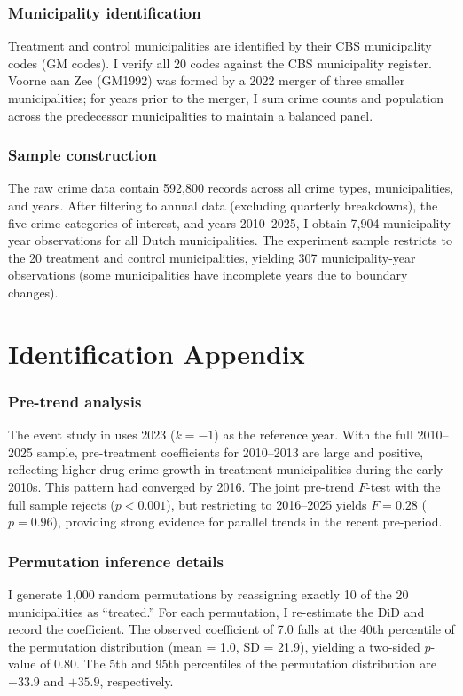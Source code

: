 \documentclass[12pt]{article}
\begin{document}
\subsubsection*{Municipality identification} Treatment and control municipalities are identified by their CBS municipality codes (GM codes). I verify all 20 codes against the CBS municipality register. Voorne aan Zee (GM1992) was formed by a 2022 merger of three smaller municipalities; for years prior to the merger, I sum crime counts and population across the predecessor municipalities to maintain a balanced panel.

\subsubsection*{Sample construction} The raw crime data contain 592,800 records across all crime types, municipalities, and years. After filtering to annual data (excluding quarterly breakdowns), the five crime categories of interest, and years 2010--2025, I obtain 7,904 municipality-year observations for all Dutch municipalities. The experiment sample restricts to the 20 treatment and control municipalities, yielding 307 municipality-year observations (some municipalities have incomplete years due to boundary changes).


\section{Identification Appendix}

\subsubsection*{Pre-trend analysis} The event study in  uses 2023 ($k = -1$) as the reference year. With the full 2010--2025 sample, pre-treatment coefficients for 2010--2013 are large and positive, reflecting higher drug crime growth in treatment municipalities during the early 2010s. This pattern had converged by 2016. The joint pre-trend $F$-test with the full sample rejects ($p < 0.001$), but restricting to 2016--2025 yields $F = 0.28$ ($p = 0.96$), providing strong evidence for parallel trends in the recent pre-period.

\subsubsection*{Permutation inference details} I generate 1,000 random permutations by reassigning exactly 10 of the 20 municipalities as ``treated.'' For each permutation, I re-estimate the DiD and record the coefficient. The observed coefficient of 7.0 falls at the 40th percentile of the permutation distribution (mean = 1.0, SD = 21.9), yielding a two-sided $p$-value of 0.80. The 5th and 95th percentiles of the permutation distribution are $-33.9$ and $+35.9$, respectively.
\end{document}
